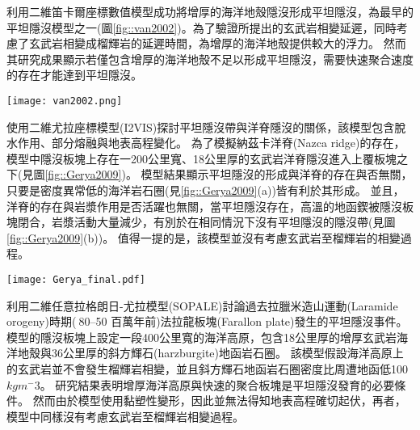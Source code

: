 \citealp{van2002role}利用二維笛卡爾座標數值模型成功將增厚的海洋地殼隱沒形成平坦隱沒，為最早的平坦隱沒模型之一(圖\ref{fig::van2002})。為了驗證\citealp{Gutscher2000}所提出的玄武岩相變延遲，\citealp{van2002role}同時考慮了玄武岩相變成榴輝岩的延遲時間，為增厚的海洋地殼提供較大的浮力。
然而其研究成果顯示若僅包含增厚的海洋地殼不足以形成平坦隱沒，需要快速聚合速度的存在才能達到平坦隱沒。

\begin{figure*}[ht!]
    \centering
    \texttt{[image: van2002.png]}
    \caption{正常的隱沒帶(左)與包含海洋高原的隱沒帶(右)隨模型時間變化，摘自\citealp{van2002role}。黑白區域繪出海洋地殼的化學成分從玄武岩(黑)到榴輝岩(白)的變化。水平軸為與海溝的距離，背景顏色為溫度。
    }
    \label{fig::van2002}
\end{figure*}

\citealp{Gerya2009}使用二維尤拉座標模型(I2VIS)探討平坦隱沒帶與洋脊隱沒的關係，該模型包含脫水作用、部分熔融與地表高程變化。
為了模擬納茲卡洋脊(Nazca ridge)的存在，模型中隱沒板塊上存在一200公里寬、18公里厚的玄武岩洋脊隱沒進入上覆板塊之下(見圖\ref{fig::Gerya2009})。
模型結果顯示平坦隱沒的形成與洋脊的存在與否無關，只要是密度異常低的海洋岩石圈(見\ref{fig::Gerya2009}(a))皆有利於其形成。
並且，洋脊的存在與岩漿作用是否活躍也無關，當平坦隱沒存在，高溫的地函鍥被隱沒板塊閉合，岩漿活動大量減少，有別於在相同情況下沒有平坦隱沒的隱沒帶(見圖\ref{fig::Gerya2009}(b))。
值得一提的是，該模型並沒有考慮玄武岩至榴輝岩的相變過程。

\begin{figure*}[ht!]
    \centering
    \texttt{[image: Gerya\_final.pdf]}
    \caption{\citealp{Gerya2009}中模型於第12個百萬年的結果。圖組(a)與圖組(b)分別為隱沒海洋地函岩石圈密度$3100 kgm^{-3}$與$3300 kgm^{-3}$的結果。(a)上圖與(b)上圖為包含洋脊隱沒的模型，(a)(b)下圖為不包含洋脊的模型，圖中白線為等溫線。其中，顏色代表不同岩相：1、2=大陸地殼、3、4=沈積物、5、6=玄武岩、7、8=輝長岩、9、10=無水地函、11=蛇紋岩、12、13、14=含水地函。
    }
    \label{fig::Gerya2009}
\end{figure*}

\citealp{Liu2016}利用二維任意拉格朗日-尤拉模型(SOPALE)討論過去拉臘米造山運動(Laramide orogeny)時期($~$80–50 百萬年前)法拉龍板塊(Farallon plate)發生的平坦隱沒事件。
模型的隱沒板塊上設定一段400公里寬的海洋高原，包含18公里厚的增厚玄武岩海洋地殼與36公里厚的斜方輝石(harzburgite)地函岩石圈。
該模型假設海洋高原上的玄武岩並不會發生榴輝岩相變，並且斜方輝石地函岩石圈密度比周遭地函低100 $kg m^-3$。
研究結果表明增厚海洋高原與快速的聚合板塊是平坦隱沒發育的必要條件。
然而由於模型使用黏塑性變形，因此並無法得知地表高程確切起伏，再者，模型中同樣沒有考慮玄武岩至榴輝岩相變過程。

